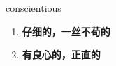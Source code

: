 
\begin{frame}
{\huge conscientious}
\begin{center}
\begin{enumerate}\Large
  \item \textbf{仔细的，一丝不苟的}
  \item \textbf{有良心的，正直的}
\end{enumerate}
\end{center}
\end{frame}
